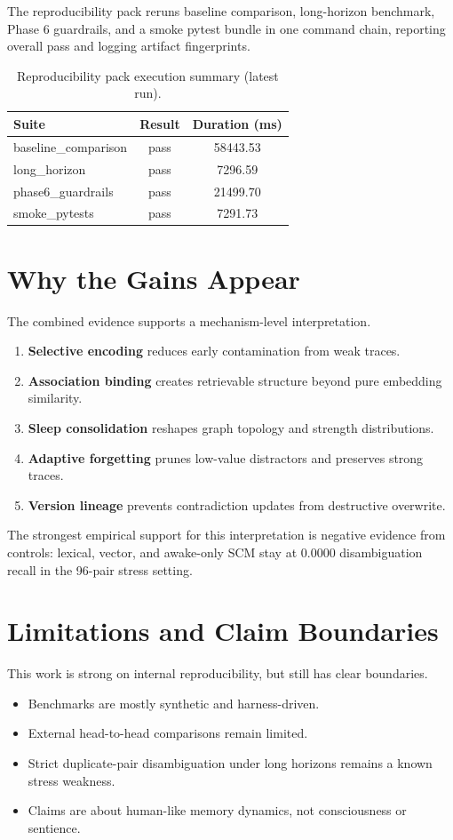 \documentclass[11pt,a4paper]{article}
\begin{document}
The reproducibility pack reruns baseline comparison, long-horizon benchmark, Phase 6 guardrails, and a smoke pytest bundle in one command chain, reporting overall pass and logging artifact fingerprints.

\begin{table}[htbp]
\centering
\caption{Reproducibility pack execution summary (latest run).}
\label{tab:repro}
\begin{tabular}{@{}lcc@{}}
\toprule
\textbf{Suite} & \textbf{Result} & \textbf{Duration (ms)} \\
\midrule
baseline\_comparison & pass & 58443.53 \\
long\_horizon & pass & 7296.59 \\
phase6\_guardrails & pass & 21499.70 \\
smoke\_pytests & pass & 7291.73 \\
\bottomrule
\end{tabular}
\end{table}

\section{Why the Gains Appear}
The combined evidence supports a mechanism-level interpretation.
\begin{enumerate}[leftmargin=1.4em]
    \item \textbf{Selective encoding} reduces early contamination from weak traces.
    \item \textbf{Association binding} creates retrievable structure beyond pure embedding similarity.
    \item \textbf{Sleep consolidation} reshapes graph topology and strength distributions.
    \item \textbf{Adaptive forgetting} prunes low-value distractors and preserves strong traces.
    \item \textbf{Version lineage} prevents contradiction updates from destructive overwrite.
\end{enumerate}

The strongest empirical support for this interpretation is negative evidence from controls: lexical, vector, and awake-only SCM stay at 0.0000 disambiguation recall in the 96-pair stress setting.

\section{Limitations and Claim Boundaries}
This work is strong on internal reproducibility, but still has clear boundaries.
\begin{itemize}[leftmargin=1.4em]
    \item Benchmarks are mostly synthetic and harness-driven.
    \item External head-to-head comparisons remain limited.
    \item Strict duplicate-pair disambiguation under long horizons remains a known stress weakness.
    \item Claims are about human-like memory dynamics, not consciousness or sentience.
\end{itemize}
\end{document}
